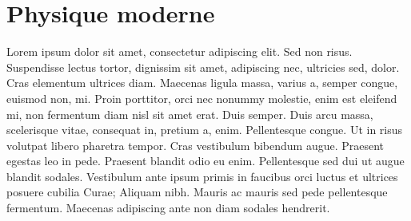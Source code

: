 \documentclass	[11pt, a4paper, openany]{book}
\begin{document}
		
		
		
		
		
		
		
		
		
		
		
		
		
		
		
		
		
		
		
		
		
		
		
		
		
		
		
		
		
		
		
		
		
		
		
		\chapter{Physique moderne}
		
		Lorem ipsum dolor sit amet, consectetur adipiscing elit. Sed non risus. Suspendisse lectus tortor, dignissim sit amet, adipiscing nec, ultricies sed, dolor. Cras elementum ultrices diam. Maecenas ligula massa, varius a, semper congue, euismod non, mi. Proin porttitor, orci nec nonummy molestie, enim est eleifend mi, non fermentum diam nisl sit amet erat. Duis semper. Duis arcu massa, scelerisque vitae, consequat in, pretium a, enim. Pellentesque congue. Ut in risus volutpat libero pharetra tempor. Cras vestibulum bibendum augue. Praesent egestas leo in pede. Praesent blandit odio eu enim. Pellentesque sed dui ut augue blandit sodales. Vestibulum ante ipsum primis in faucibus orci luctus et ultrices posuere cubilia Curae; Aliquam nibh. Mauris ac mauris sed pede pellentesque fermentum. Maecenas adipiscing ante non diam sodales hendrerit.
		
		
		
		
		
		
		
		
		
		
		
		
		
		
		
		
		
		
		
		
		
		
		
		
		
		
		
		
		
		
		
\end{document}
